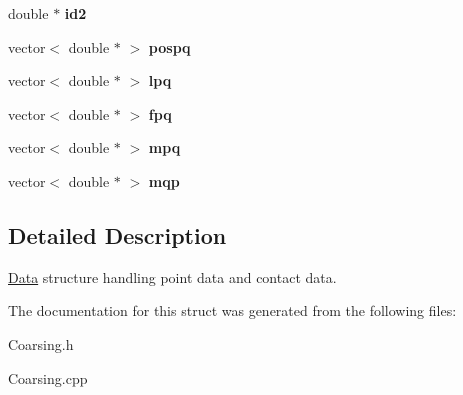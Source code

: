 \begin{DoxyCompactItemize}
\mbox{\label{structData_aceab4d0bbe0b13734353bd1a67172485}} 
double $\ast$ {\bfseries id2}
\item 
\mbox{\label{structData_a3cf4988534226aa1a566dfffb629f473}} 
vector$<$ double $\ast$ $>$ {\bfseries pospq}
\item 
\mbox{\label{structData_aa46a77763360df63a36f61d06ffb339b}} 
vector$<$ double $\ast$ $>$ {\bfseries lpq}
\item 
\mbox{\label{structData_a486a5f50a69db7164ab0304464028935}} 
vector$<$ double $\ast$ $>$ {\bfseries fpq}
\item 
\mbox{\label{structData_a2f41a3378af42030c55ea80b7027e9da}} 
vector$<$ double $\ast$ $>$ {\bfseries mpq}
\item 
\mbox{\label{structData_ab25c53d90730b3488150cad41641c5d6}} 
vector$<$ double $\ast$ $>$ {\bfseries mqp}
\end{DoxyCompactItemize}


\subsection{Detailed Description}
\hyperlink{structData}{Data} structure handling point data and contact data. 

The documentation for this struct was generated from the following files\+:\begin{DoxyCompactItemize}
\item 
Coarsing.\+h\item 
Coarsing.\+cpp\end{DoxyCompactItemize}
